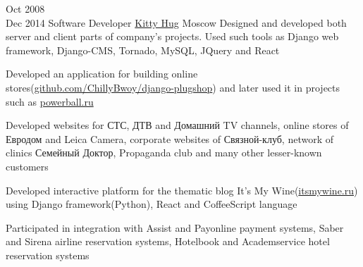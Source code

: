 \documentclass[11pt,a4paper,sans]{moderncv}
\newcommand{\lang}[2]{#2}
\begin{document}
\cventry
    {\lang{Окт}{Oct} 2008\\\lang{Дек}{Dec} 2014}
    {\lang
        {Программист}
        {Software Developer}}
    {\href{http://kittyhug.ru}{Kitty Hug}}
    {\lang
        {Москва}
        {Moscow}}
    {}
    {\lang
        {Занимался разработкой и проектированием как серверной, так и клиентской части проектов компании. Использовал Django, Django-CMS, Tornado, MySQL, JQuery и React, занимался написанием юнит-тестов.}
        {Designed and developed both server and client parts of company's projects. Used such tools as Django web framework, Django-CMS, Tornado, MySQL, JQuery and React}}

\cvlistitem
    {\lang
        {Разработал приложение \href{https://github.com/ChillyBwoy/django-plugshop}{django-plugshop}, на основе которого в дальнейшем было создано несколько интернет-магазинов, например deathstar.ru и \href{http://powerball.ru}{powerball.ru}}
        {Developed an application for building online stores(\href{https://github.com/ChillyBwoy/django-plugshop}{github.com/ChillyBwoy/django-plugshop})} and later used it in projects such as \href{http://powerball.ru}{powerball.ru}}

\cvlistitem
    {\lang
        {Делал сайты для телеканалов СТС, ДТВ и Домашний, интернет-магазина «Евродом», фотоаппаратов «Leica Camera», «Связного-клуба», сети поликлиник «Семейный Доктор», клуба «Пропаганда», кафе «Filial»(\href{http://filialmoscow.com/ru/}{filialmoscow.com}), торгово-офисного центра «Гименей»(\href{http://himeney.ru}{himeney.ru}) и многих других менее известных клиентов}
        {Developed websites for {\textquotedbl}СТС{\textquotedbl}, {\textquotedbl}ДТВ{\textquotedbl} and {\textquotedbl}Домашний{\textquotedbl} TV channels, online stores of {\textquotedbl}Евродом{\textquotedbl} and {\textquotedbl}Leica Camera{\textquotedbl}, corporate websites of {\textquotedbl}Связной-клуб{\textquotedbl}, network of clinics {\textquotedbl}Семейный Доктор{\textquotedbl}, {\textquotedbl}Propaganda club{\textquotedbl} and many other lesser-known customers}}


\cvlistitem
    {\lang
        {Разработал интерактивную издательскую платформу для тематического блога «It's My Wine»(\href{http://itsmywine.ru}{itsmywine.ru})}
        {Developed interactive platform for the thematic blog {\textquotedbl}It's My Wine{\textquotedbl}(\href{http://itsmywine.ru}{itsmywine.ru}) using Django framework(Python), React and CoffeeScript language}}


\cvlistitem
    {\lang
        {Занимался интеграцией с платёжными системами Assist и Payonline, системами бронирования авиабилетов Sabre и Sirena, системами бронирования отелей Hotelbook и Академсервис}
        {Participated in integration with {\textquotedbl}Assist{\textquotedbl} and {\textquotedbl}Payonline{\textquotedbl} payment systems, {\textquotedbl}Saber{\textquotedbl} and {\textquotedbl}Sirena{\textquotedbl} airline reservation systems, {\textquotedbl}Hotelbook{\textquotedbl} and {\textquotedbl}Academservice{\textquotedbl} hotel reservation systems}\\}
\end{document}
